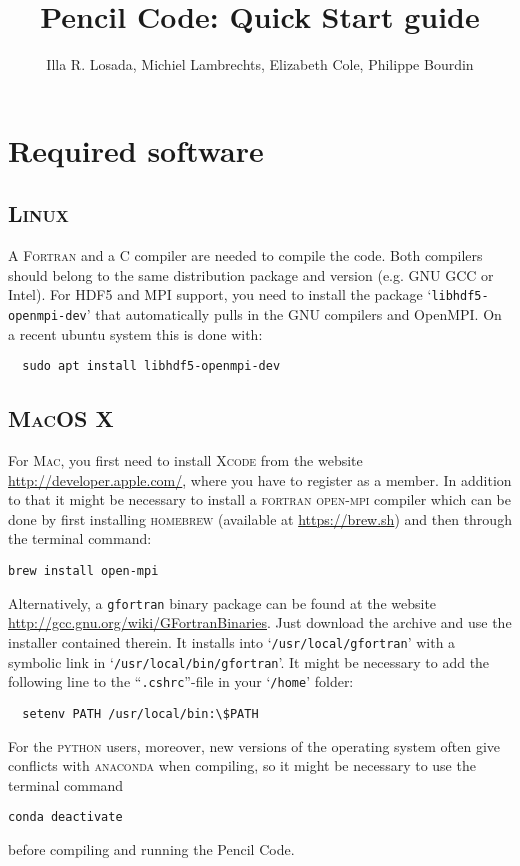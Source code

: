 \documentclass[a4paper,12pt]{article}
\title{Pencil Code: Quick Start guide}
\author{Illa R. Losada, Michiel Lambrechts, Elizabeth Cole, Philippe Bourdin}
\newcommand{\command}[1]{\texttt{#1}}
\newcommand{\file}[1]{``\texttt{#1}''}
\newcommand{\directory}[1]{`\texttt{#1}'}
\newcommand{\name}[1]{\textsc{#1}}
\begin{document}
\maketitle

\tableofcontents

\newpage


\section{Required software}

\subsection{\name{Linux}}
A \name{Fortran} and a \name{C} compiler are needed to compile the code.
Both compilers should belong to the same distribution package and version (e.g. GNU GCC or Intel).
For HDF5 and MPI support, you need to install the package \directory{libhdf5-openmpi-dev} that automatically pulls in the GNU compilers and OpenMPI. On a recent ubuntu system this is done with:
\begin{verbatim}
  sudo apt install libhdf5-openmpi-dev
\end{verbatim}

\subsection{\name{MacOS X}}
For \name{Mac}, you first need to install \name{Xcode} from the
website \url{http://developer.apple.com/}, where you have to register as a member.
In addition to that it might be necessary to install a \name{fortran} \name{open-mpi} compiler which can be done by first installing \name{homebrew} (available at \url{https://brew.sh}) and then through the terminal command:
\begin{verbatim}
brew install open-mpi
\end{verbatim}
Alternatively, a \command{gfortran} binary package can be found at the website \url{http://gcc.gnu.org/wiki/GFortranBinaries}. Just download the archive and use the installer contained therein.
It installs into \directory{/usr/local/gfortran} with
a symbolic link in \directory{/usr/local/bin/gfortran}. It might be necessary to add
the following line to the \file{.cshrc}-file in your \directory{/home} folder:
\begin{verbatim}
  setenv PATH /usr/local/bin:\$PATH
\end{verbatim} 
For the \name{python} users, moreover, new versions of the operating system often give conflicts with \name{anaconda} when compiling, so it might be necessary to use the terminal command 
\begin{verbatim}
conda deactivate
\end{verbatim}
before compiling and running the Pencil Code.
\end{document}
